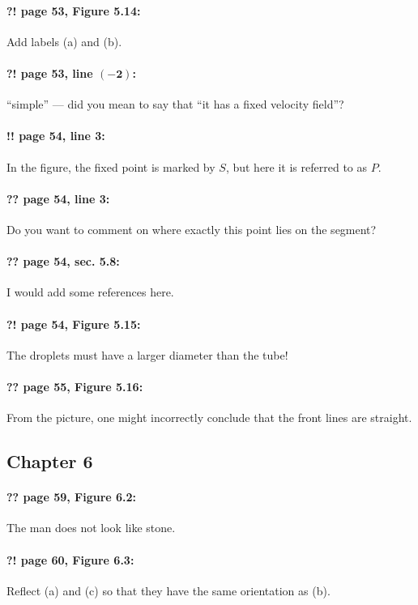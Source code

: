 \documentclass[twoside]{article}
\begin{document}
\paragraph{?! page 53, Figure 5.14:} Add labels (a) and (b).

\paragraph{?! page 53, line $\bm{(-2)}$:} “simple” — did you mean to say that “it has a fixed velocity field”?

\paragraph{!! page 54, line 3:} In the figure, the fixed point is marked by $S$, but here it is referred to as $P$.

\paragraph{?? page 54, line 3:} Do you want to comment on where exactly this point lies on the segment?

\paragraph{?? page 54, sec. 5.8:} I would add some references here.

\paragraph{?! page 54, Figure 5.15:} The droplets must have a larger diameter than the tube!

\paragraph{?? page 55, Figure 5.16:} From the picture, one might incorrectly conclude that the front lines are straight.

\subsection*{Chapter 6}

\paragraph{?? page 59, Figure 6.2:} The man does not look like stone.

\paragraph{?! page 60, Figure 6.3:} Reflect (a) and (c) so that they have the same orientation as (b).
\end{document}
